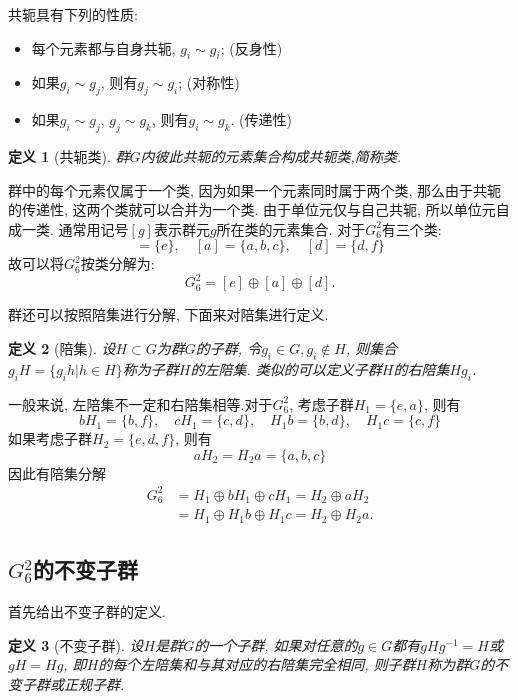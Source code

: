 \documentclass[UTF8]{ctexart}
\newtheorem{define}{定义}
\begin{document}
共轭具有下列的性质:
\begin{itemize}
\item 每个元素都与自身共轭, $g_i \sim g_i$; (反身性)
\item 如果$g_i \sim g_j$, 则有$g_j \sim g_i$; (对称性)
\item 如果$g_i \sim g_j$, $g_j \sim g_k$, 则有$g_i \sim g_k$. (传递性)
\end{itemize}

\begin{define}[共轭类]
群$G$内彼此共轭的元素集合构成共轭类,简称类.
\end{define}

群中的每个元素仅属于一个类, 因为如果一个元素同时属于两个类, 那么由于共轭的传递性, 这两个类就可以合并为一个类. 由于单位元仅与自己共轭, 所以单位元自成一类. 通常用记号$[g]$表示群元$g$所在类的元素集合. 对于$G_6^2$有三个类:
\begin{equation}
[e] = \{e\}, \quad [a] = \{a, b, c\}, \quad [d] = \{d, f\}
\end{equation}
故可以将$G_6^2$按类分解为:
\begin{equation}
G_6^2 = [e] \oplus [a] \oplus [d].
\end{equation}

群还可以按照陪集进行分解, 下面来对陪集进行定义.
\begin{define}[陪集]
设$H \subset G$为群$G$的子群, 令$g_i \in G, g_i \notin H$, 则集合$g_i H = \{g_i h | h \in H\}$称为子群$H$的左陪集. 类似的可以定义子群$H$的右陪集$H g_i$.
\end{define}

一般来说, 左陪集不一定和右陪集相等.对于$G_6^2$, 考虑子群$H_1 = \{e, a\}$, 则有
\begin{equation}
b H_1 = \{b, f\}, \quad c H_1 = \{c, d\}, \quad H_1 b = \{b,d\}, \quad H_1 c = \{c, f\}
\end{equation}
如果考虑子群$H_2 = \{e, d, f\}$, 则有
\begin{equation}
a H_2 = H_2 a = \{a, b, c\}
\end{equation}
因此有陪集分解
\begin{equation}
\begin{split}
G_6^2 &= H_1 \oplus b H_1 \oplus c H_1 = H_2 \oplus a H_2 \\
 &= H_1 \oplus H_1 b \oplus H_1 c = H_2 \oplus H_2 a.
\end{split}
\end{equation}
\subsection{$G_6^2$的不变子群}
首先给出不变子群的定义.
\begin{define}[不变子群]
设$H$是群$G$的一个子群, 如果对任意的$g \in G$都有$gHg^{-1}=H$或$gH = Hg$, 即$H$的每个左陪集和与其对应的右陪集完全相同, 则子群$H$称为群$G$的不变子群或正规子群.
\end{define}
\end{document}
